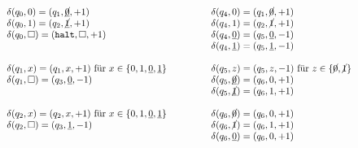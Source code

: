 \documentclass{uebung_cs}
\begin{document}
\begin{exercise}
	\[
		\begin{tabular}{p{7.2cm}p{7.2cm}}
			$\delta(q_0,0) = (q_1,\underline{\cancel{0}},+1)$                                                                & $\delta(q_4,0) = (q_1,\cancel{0},+1)$                              \\
			$\delta(q_0,1) = (q_2,\underline{\cancel{1}},+1)$                                                                & $\delta(q_4,1) = (q_2,\cancel{1},+1)$                              \\
			$\delta(q_0,\square) = (\mathtt{halt},\square ,+1)$                                                              & $\delta(q_4,\underline{0}) = (q_5,\underline{0},-1)$               \\
			                                                                                                                 & $\delta(q_4,\underline{1}) = (q_5,\underline{1},-1)$               \\
			                                                                                                                 &                                                                    \\
			$\delta(q_1,x) = (q_1,x,+1)$ für $x \in \{0,1,\underline{0},\underline{1}\}$                                     & $\delta(q_5,z) = (q_5,z,-1)$ für $z \in \{\cancel{0},\cancel{1}\}$ \\
			$\delta(q_1,\square) = (q_3,\underline{0},-1)$                                                                   & $\delta(q_5,\underline{\cancel{0}}) = (q_6,0,+1)$                  \\
			                                                                                                                 & $\delta(q_5,\underline{\cancel{1}}) = (q_6,1,+1) $                 \\
			                                                                                                                 &                                                                    \\
			$\delta(q_2,x) = (q_2,x,+1)$ für $x \in \{0,1,\underline{0},\underline{1}\}$                                     & $\delta(q_6,\cancel{0}) = (q_6,0,+1)$                              \\
			$\delta(q_2,\square) = (q_3,\underline{1},-1)$                                                                   & $\delta(q_6,\cancel{1}) = (q_6,1,+1)$                              \\
			                                                                                                                 & $\delta(q_6,\underline{0}) = (q_6,0,+1)$                           \\

\end{tabular}\]
\end{exercise}
\end{document}
